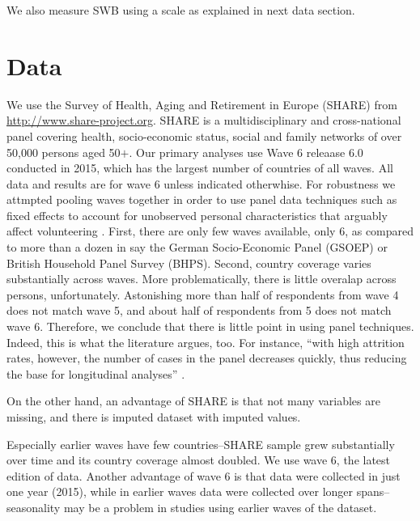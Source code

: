 \documentclass[10pt, letterpaper]{article}
\begin{document}
\begin{spacing}{1.4}
We also measure SWB using a scale as explained in next data section.

\section{Data} 

We use the Survey of Health, Aging and Retirement in Europe (SHARE) from
\url{http://www.share-project.org}.
 SHARE is a multidisciplinary and
cross-national panel covering health, socio-economic status,
social and family networks of over 50,000 persons aged 50$+$. Our primary
analyses use %
 Wave 6 releaase 6.0
 conducted  in 2015, which has the largest number of
countries of all waves.  All data and results are for wave 6 unless indicated otherwhise.
For robustness we attmpted pooling waves together in order to use panel data
techniques such as fixed effects to account for unobserved personal
characteristics that arguably affect volunteering \citep{meier08}. 
First, there are only few waves available, only 6,  as compared to more than a
dozen in say the German Socio-Economic Panel (GSOEP) or British Household Panel
Survey (BHPS). Second, country coverage varies substantially across waves.
 More problematically, there is little overalap across persons, unfortunately.
Astonishing more than half of respondents from wave 4 does not match wave 5, and
about half of respondents from 5 does not match wave 6.  Therefore, we conclude
that there is little point in using panel techniques.
%
Indeed, this is what the literature argues, too. For instance, ``with 
high attrition rates, however, the number of cases  in the panel decreases quickly, 
thus  reducing  the  base  for  longitudinal  analyses'' \citep{blom2011sample}. 

On the other hand, an advantage of SHARE is that not many variables are missing,
and there is imputed dataset with imputed values. %
                                
Especially earlier waves have few countries--SHARE sample grew substantially
over time and its country coverage almost doubled.
We use  wave 6, the latest edition of data. Another advantage of wave 6 is that
data were collected in just one year (2015), %
while in earlier waves data were collected over longer spans--seasonality may be
a problem in studies using earlier waves of the dataset.


\end{spacing}
\end{document}
